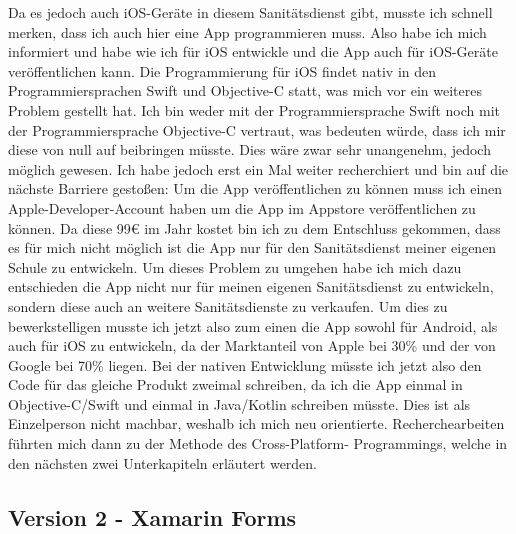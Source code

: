     Da es jedoch auch iOS-Geräte in diesem Sanitätsdienst gibt, musste ich schnell merken, 
    dass ich auch hier eine App programmieren muss. Also habe ich mich informiert und habe 
    wie ich für iOS entwickle und die App auch für iOS-Geräte veröffentlichen kann.
    Die Programmierung für iOS findet nativ in den Programmiersprachen Swift und Objective-C
    statt, was mich vor ein weiteres Problem gestellt hat. Ich bin weder mit der Programmiersprache
    Swift noch mit der Programmiersprache Objective-C vertraut, was bedeuten würde, dass ich mir
    diese von null auf beibringen müsste. Dies wäre zwar sehr unangenehm, jedoch möglich gewesen.
    Ich habe jedoch erst ein Mal weiter recherchiert und bin auf die nächste Barriere gestoßen:
    Um die App veröffentlichen zu können muss ich einen Apple-Developer-Account haben um die App
    im Appstore veröffentlichen zu können. Da diese 99€ im Jahr kostet bin ich zu dem Entschluss 
    gekommen, dass es für mich nicht möglich ist die App nur für den Sanitätsdienst meiner eigenen Schule
    zu entwickeln. Um dieses Problem zu umgehen habe ich mich dazu entschieden die App nicht 
    nur für meinen eigenen Sanitätsdienst zu entwickeln, sondern diese auch an weitere Sanitätsdienste
    zu verkaufen. Um dies zu bewerkstelligen musste ich jetzt also zum einen die App sowohl für
    Android, als auch für iOS zu entwickeln, da der Marktanteil von Apple bei 30\% und der von Google bei
    70\% liegen\cite[vgl.]{Marktanteil}. Bei der nativen Entwicklung müsste ich jetzt also 
    den Code für das \glqq gleiche\grqq{} Produkt zweimal schreiben, da ich die App einmal in
    Objective-C/Swift und einmal in Java/Kotlin schreiben müsste.
    Dies ist als Einzelperson nicht machbar, weshalb ich mich neu orientierte. 
    Recherchearbeiten führten mich dann zu der Methode des Cross-Platform-
    Programmings, welche in den nächsten zwei Unterkapiteln erläutert werden.

\subsection{Version 2 - Xamarin Forms}

